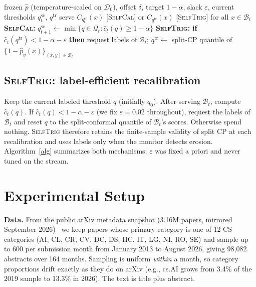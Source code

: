 \documentclass[conference]{IEEEtran}
\newcommand{\selfcal}{\textsc{SelfCal}}
\newcommand{\selftrig}{\textsc{SelfTrig}}
\newcommand{\chat}{\hat{c}}
\begin{document}
\begin{algorithm}[t]
\caption{\selfcal{} and \selftrig{} (one month $t$)}
\label{alg}
\begin{algorithmic}[1]
\REQUIRE frozen $\hat p$ (temperature-scaled on $\mathcal{D}_0$), offset $\delta$, target $1-\alpha$, slack $\varepsilon$, current thresholds $q^{\mathrm{sc}}_t$, $q^{\mathrm{tr}}$
\STATE serve $C_{q^{\mathrm{sc}}_t}(x)$ [\selfcal] or $C_{q^{\mathrm{tr}}}(x)$ [\selftrig] for all $x\in\mathcal{B}_t$
\STATE \textbf{\selfcal:} $q^{\mathrm{sc}}_{t+1}\leftarrow\min\{q\in\mathcal{Q}_t:\chat_t(q)\ge 1-\alpha\}$ 
\STATE \textbf{\selftrig:} \textbf{if} $\chat_t(q^{\mathrm{tr}})<1-\alpha-\varepsilon$ \textbf{then} request labels of $\mathcal{B}_t$; $q^{\mathrm{tr}}\leftarrow$ split-CP quantile of $\{1-\hat p_{y}(x)\}_{(x,y)\in\mathcal{B}_t}$
\end{algorithmic}
\end{algorithm}
\subsection{\selftrig{}: label-efficient recalibration}
Keep the current labeled threshold $q$ (initially $q_0$). After serving $\mathcal{B}_t$, compute $\chat_t(q)$. If $\chat_t(q)<1-\alpha-\varepsilon$ (we fix $\varepsilon{=}0.02$ throughout), request the labels of $\mathcal{B}_t$ and reset $q$ to the split-conformal quantile of $\mathcal{B}_t$'s scores. Otherwise spend nothing. \selftrig{} therefore retains the finite-sample validity of split CP at each recalibration and uses labels only when the monitor detects erosion. Algorithm~\ref{alg} summarizes both mechanisms; $\varepsilon$ was fixed a priori and never tuned on the stream.

\section{Experimental Setup}
\textbf{Data.} From the public arXiv metadata snapshot (3.16M papers, mirrored September 2026)~\cite{arxivdataset} we keep papers whose primary category is one of 12 CS categories (AI, CL, CR, CV, DC, DS, HC, IT, LG, NI, RO, SE) and sample up to 600 per submission month from January 2013 to August 2026, giving 98{,}082 abstracts over 164 months. Sampling is uniform \emph{within} a month, so category proportions drift exactly as they do on arXiv (e.g., cs.AI grows from 3.4\% of the 2019 sample to 13.3\% in 2026). The text is title plus abstract.
\end{document}
